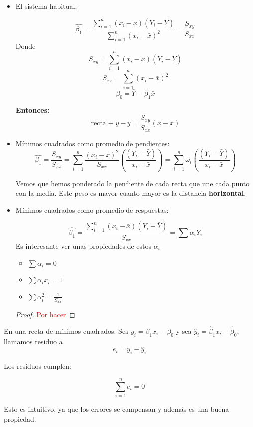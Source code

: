 \documentclass[palatino,nochap]{apuntes}
\begin{document}
\begin{itemize}

	\item El sistema habitual:

	\[ \hat{β_1} = \frac{\sum_{i=1}^n(x_i - \bar{x})(Y_i - \bar{Y})}{\sum_{i=1}^n (x_i - \bar{x})^2} = \frac{S_{xy}}{S_{xx}} \]
	Donde
		\[S_{xy} = \sum_{i=1}^n(x_i - \bar{x})(Y_i - \bar{Y}) \]
		\label{Ssubxx}
		\[S_{xx} = \sum_{i=1}^n (x_i - \bar{x})^2\]
	\subitem \[β_0 = \bar{Y} - β_1\bar{x}\]

	\textbf{Entonces:}
	\[\text{recta} \equiv y - \bar{y} = \frac{S_{xy}}{S_{xx}}(x - \bar{x} ) \]

	\item Mínimos cuadrados como promedio de pendientes:
	\label{rmc::promediopendientes}
	\[
	\hat{β_1} = \frac{S_{xy}}{S_{xx}} = \sum_{i=1}^n \frac{(x_i - \bar{x})^2}{S_{xx}} \left( \frac{(Y_i - \bar{Y})}{x_i - \bar{x}} \right) = \sum_{i=1}^n ω_i \left( \frac{(Y_i - \bar{Y})}{x_i - \bar{x}} \right)
	\]

	Vemos que hemos ponderado la pendiente de cada recta que une cada punto con la media. Este peso es mayor cuanto mayor es la distancia \textbf{horizontal}.

	\item Mínimos cuadrados como promedio de respuestas:

	\[
	\hat{β_1} = \frac{\sum_{i=1}^n  (x_i - \bar{x}) (Y_i - \bar{Y})}{S_{xx}} = \sum α_i Y_i
	\]
	Es interesante ver unas propiedades de estos $α_i$
	\begin{prop}


		\begin{itemize}
			\item[] $\sum α_i = 0$
			\item[] $\sum α_ix_i = 1$
			\item[] $\sum α_i^2 = \frac{1}{S_{xx}}$
		\end{itemize}

	\end{prop}
	\begin{proof}
	\textcolor{red}{Por hacer}
	\end{proof}

\end{itemize}


\begin{defn}[Residuo]
En una recta de mínimos cuadrados: Sea $y_i = β_1x_i - β_0$ y sea $\hat{y}_i = \hat{β}_1x_i - \hat{β}_0$, llamamos residuo a $$e_i = y_i - \hat{y}_i$$

Los residuos cumplen:

\[
\sum_{i=1}^n e_i = 0
\]

Esto es intuitivo, ya que los errores se compensan y además es una buena propiedad.
\end{defn}
\end{document}
